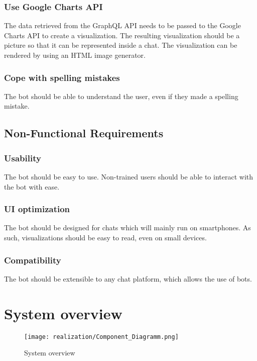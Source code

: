 \subsubsection{Use Google Charts API}
The data retrieved from the GraphQL API needs to be passed to the Google Charts API to create a visualization. The resulting visualization should be a picture so that it can be represented inside a chat. The visualization can be rendered by using an HTML image generator.

\subsubsection{Cope with spelling mistakes} The bot should be able to understand the user, even if they made a spelling mistake.

\subsection{Non-Functional Requirements}

\subsubsection{Usability} The bot should be easy to use. Non-trained users should be able to interact with the bot with ease.

\subsubsection{UI optimization} The bot should be designed for chats which will mainly run on smartphones. As such, visualizations should be easy to read, even on small devices.

\subsubsection{Compatibility} The bot should be extensible to any chat platform, which allows the use of bots.

\section{System overview}


\begin{figure}[h]
    \centering
    \texttt{[image: realization/Component\_Diagramm.png]}
    \caption{System overview}
    \label{fig:sytsemOverview}
\end{figure}

